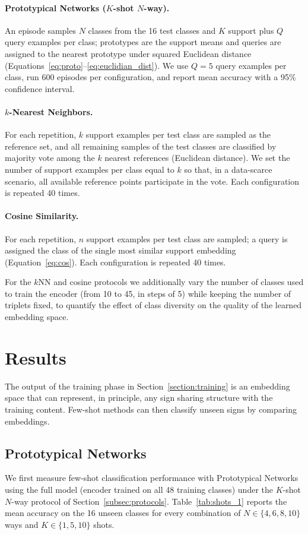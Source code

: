 \documentclass{article}
\begin{document}
\paragraph{Prototypical Networks ($K$-shot $N$-way).} An episode samples $N$ classes from the 16 test classes and $K$ support plus $Q$ query examples per class; prototypes are the support means and queries are assigned to the nearest prototype under squared Euclidean distance (Equations~\ref{eq:proto}--\ref{eq:euclidian_dist}). We use $Q=5$ query examples per class, run 600 episodes per configuration, and report mean accuracy with a 95\% confidence interval.

\paragraph{$k$-Nearest Neighbors.} For each repetition, $k$ support examples per test class are sampled as the reference set, and all remaining samples of the test classes are classified by majority vote among the $k$ nearest references (Euclidean distance). We set the number of support examples per class equal to $k$ so that, in a data-scarce scenario, all available reference points participate in the vote. Each configuration is repeated 40 times.

\paragraph{Cosine Similarity.} For each repetition, $n$ support examples per test class are sampled; a query is assigned the class of the single most similar support embedding (Equation~\ref{eq:cos}). Each configuration is repeated 40 times.

For the $k$NN and cosine protocols we additionally vary the number of classes used to train the encoder (from 10 to 45, in steps of 5) while keeping the number of triplets fixed, to quantify the effect of class diversity on the quality of the learned embedding space.

\section{Results}
\label{section:results}
The output of the training phase in Section~\ref{section:training} is an embedding space that can represent, in principle, any sign sharing structure with the training content. Few-shot methods can then classify unseen signs by comparing embeddings.

\subsection{Prototypical Networks}
We first measure few-shot classification performance with Prototypical Networks using the full model (encoder trained on all 48 training classes) under the $K$-shot $N$-way protocol of Section~\ref{subsec:protocols}. Table~\ref{tab:shots_1} reports the mean accuracy on the 16 unseen classes for every combination of $N\in\{4,6,8,10\}$ ways and $K\in\{1,5,10\}$ shots.
\end{document}
